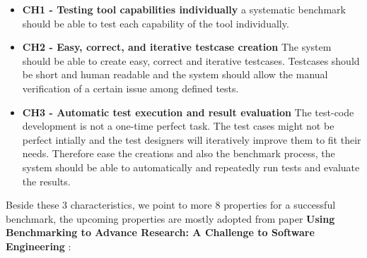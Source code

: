 \documentclass[authoryear,preprint]{sigplanconf}
\begin{document}
\begin{itemize}
	\item \textbf{CH1 - Testing tool capabilities individually} a systematic benchmark should be able to test each capability of the tool individually. 
	\item \textbf{CH2 - Easy, correct, and iterative testcase creation} The system should be able to create easy, correct and iterative testcases. Testcases should be short and human readable and the system should allow the manual verification of a certain issue among defined tests. 
	\item \textbf{CH3 - Automatic test execution and result evaluation} The test-code development is not a one-time perfect task. The test cases might not be perfect intially and the test designers will iteratively improve them to fit their needs. Therefore ease the creations and also the benchmark process, the system should be able to automatically and repeatedly run tests and evaluate the results. 
\end{itemize}

Beside these 3 characteristics, we point to more 8 properties for a successful benchmark, the upcoming properties are mostly adopted from paper \textbf{Using Benchmarking to Advance Research: A Challenge to Software Engineering} \cite{sim2003}:
\end{document}
